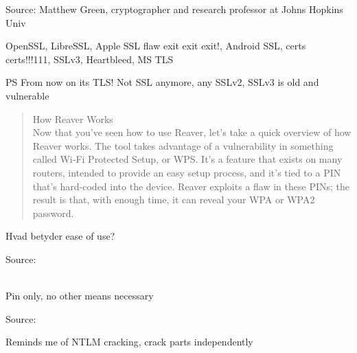 \documentclass[20pt,landscape,a4paper]{foils}
\begin{document}
Source: Matthew Green, cryptographer and research professor at Johns Hopkins Univ\\
{\tiny{}
 
}


OpenSSL, LibreSSL, Apple SSL flaw exit exit exit!, Android SSL, certs certs!!!111, SSLv3, Heartbleed, MS TLS




\vskip 1cm
PS From now on its TLS! Not SSL anymore, any SSLv2, SSLv3 is old and vulnerable


\begin{quote}
How Reaver Works\\
Now that you've seen how to use Reaver, let's take a quick overview of how Reaver works. The tool takes advantage of a vulnerability in something called Wi-Fi Protected Setup, or WPS. It's a feature that exists on many routers, intended to provide an easy setup process, and it's tied to a PIN that's hard-coded into the device. Reaver exploits a flaw in these PINs; the result is that, with enough time, it can reveal your WPA or WPA2 password.
\end{quote}

\centerline{Hvad betyder ease of use?}

Source: \\
\\
{\footnotesize {}}



\centerline{Pin only, no other means necessary}

Source:\\





\centerline{Reminds me of NTLM cracking, crack parts independently}
\end{document}
